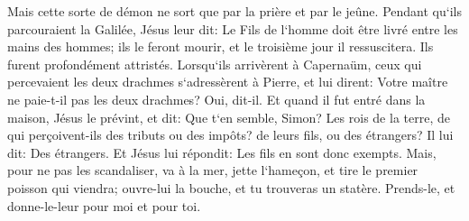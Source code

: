 \verse Mais cette sorte de démon ne sort que par la prière et par le jeûne. 
\verse Pendant qu`ils parcouraient la Galilée, Jésus leur dit: Le Fils de l`homme doit être livré entre les mains des hommes; 
\verse ils le feront mourir, et le troisième jour il ressuscitera. Ils furent profondément attristés. 
\verse Lorsqu`ils arrivèrent à Capernaüm, ceux qui percevaient les deux drachmes s`adressèrent à Pierre, et lui dirent: Votre maître ne paie-t-il pas les deux drachmes? 
\verse Oui, dit-il. Et quand il fut entré dans la maison, Jésus le prévint, et dit: Que t`en semble, Simon? Les rois de la terre, de qui perçoivent-ils des tributs ou des impôts? de leurs fils, ou des étrangers? 
\verse Il lui dit: Des étrangers. Et Jésus lui répondit: Les fils en sont donc exempts. 
\verse Mais, pour ne pas les scandaliser, va à la mer, jette l`hameçon, et tire le premier poisson qui viendra; ouvre-lui la bouche, et tu trouveras un statère. Prends-le, et donne-le-leur pour moi et pour toi. 

